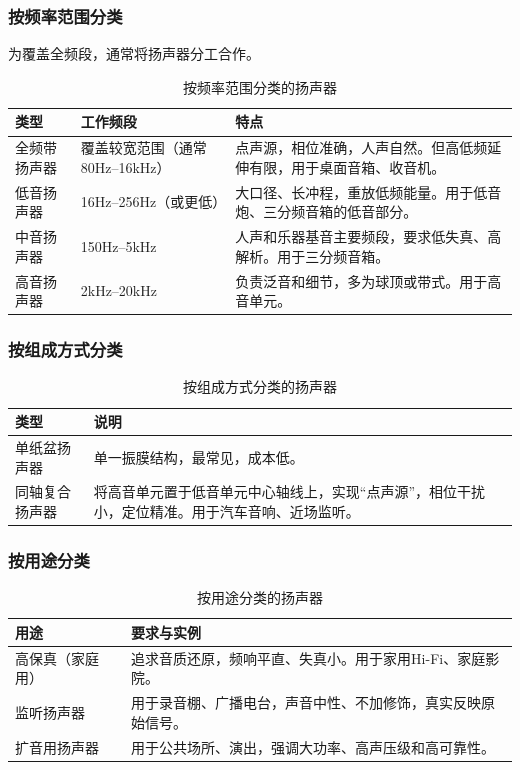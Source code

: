 \documentclass[12pt,UTF8]{ctexbook}
\begin{document}
\subsubsection{按频率范围分类}

为覆盖全频段，通常将扬声器分工合作。
	
\begin{table}[h]
\centering
\caption{按频率范围分类的扬声器}
\begin{tabular}{p{3cm}p{4cm}p{5cm}}
\toprule
\textbf{类型} & \textbf{工作频段} & \textbf{特点} \\
\midrule
全频带扬声器 & 覆盖较宽范围（通常80Hz--16kHz） & 点声源，相位准确，人声自然。但高低频延伸有限，用于桌面音箱、收音机。 \\
低音扬声器 & 16Hz--256Hz（或更低） & 大口径、长冲程，重放低频能量。用于低音炮、三分频音箱的低音部分。 \\
中音扬声器 & 150Hz--5kHz & 人声和乐器基音主要频段，要求低失真、高解析。用于三分频音箱。 \\
高音扬声器 & 2kHz--20kHz & 负责泛音和细节，多为球顶或带式。用于高音单元。 \\
\bottomrule
\end{tabular}
\end{table}
	
\subsubsection{按组成方式分类}

\begin{table}[h]
\centering
\caption{按组成方式分类的扬声器}
\begin{tabular}{p{3cm}p{8cm}}
\toprule
\textbf{类型} & \textbf{说明} \\
\midrule
单纸盆扬声器 & 单一振膜结构，最常见，成本低。 \\
同轴复合扬声器 & 将高音单元置于低音单元中心轴线上，实现“点声源”，相位干扰小，定位精准。用于汽车音响、近场监听。 \\
\bottomrule
\end{tabular}
\end{table}
	
\subsubsection{按用途分类}

\begin{table}[h]
\centering
\caption{按用途分类的扬声器}
\begin{tabular}{p{3cm}p{8cm}}
\toprule
\textbf{用途} & \textbf{要求与实例} \\
\midrule
高保真（家庭用） & 追求音质还原，频响平直、失真小。用于家用Hi-Fi、家庭影院。 \\
监听扬声器 & 用于录音棚、广播电台，声音中性、不加修饰，真实反映原始信号。 \\
扩音用扬声器 & 用于公共场所、演出，强调大功率、高声压级和高可靠性。 \\
\bottomrule
\end{tabular}
\end{table}
	
\end{document}

